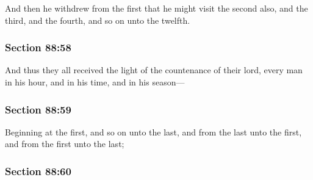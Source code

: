 		And then he withdrew from the first that he might visit the second also, and the third, and the fourth, and so on unto the twelfth.


	\subsubsection{Section 88:58} %
		\label{DC88-58}

		And thus they all received the light of the countenance of their lord, every man in his hour, and in his time, and in his season---


	\subsubsection{Section 88:59} %
		\label{DC88-59}

		Beginning at the first, and so on unto the last, and from the last unto the first, and from the first unto the last;


	\subsubsection{Section 88:60} %
		\label{DC88-60}

